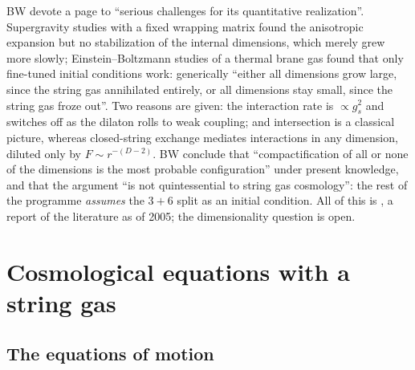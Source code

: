 \begin{historybox}
BW devote a page to ``serious challenges for its quantitative realization''.
 Supergravity studies with a fixed wrapping matrix found
the anisotropic expansion but no stabilization of the internal dimensions, which merely grew
more slowly; Einstein--Boltzmann studies of a thermal brane gas found that only fine-tuned
initial conditions work: generically ``either all dimensions grow large, since the string gas
annihilated entirely, or all dimensions stay small, since the string gas froze out''. Two
reasons are given: the interaction rate is $\propto g_s^2$ and switches off as the dilaton
rolls to weak coupling; and intersection is a classical picture, whereas closed-string
exchange mediates interactions in any dimension, diluted only by $F\sim r^{-(D-2)}$. BW
conclude that ``compactification of all or none of the dimensions is the most probable
configuration'' under present knowledge, and that the argument ``is not quintessential to
string gas cosmology'': the rest of the programme \emph{assumes} the $3+6$ split as an
initial condition.  All of this is \TL{},
a report of the literature as of 2005; the dimensionality question is open.
\end{historybox}

\section{Cosmological equations with a string gas}\label{sec:cosmology:dynamics}

\subsection{The equations of motion}

